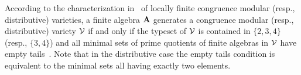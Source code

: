 
According to the characterization
in~\cite[Ch.~8]{HM:1988} of locally finite congruence modular (resp.,
distributive) varieties, a finite algebra $\mathbf{A}$ generates a congruence modular
(resp., distributive) variety $\mathcal{V}$ if and only if the typeset of $\mathcal{V}$ is
contained in $\{2, 3, 4\}$ (resp., $\{3, 4\}$) and all minimal sets of prime
quotients of finite algebras in $\mathcal{V}$ have empty
tails~\cite[Def.~2.15]{HM:1988}. Note that in the distributive 
case the empty tails condition is equivalent to the minimal sets all having exactly
two elements.

